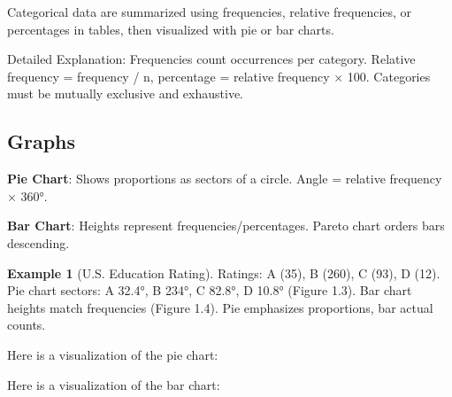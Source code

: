 \documentclass{article}
\theoremstyle{definition}
\newtheorem{example}{Example}
\begin{document}
	Categorical data are summarized using frequencies, relative frequencies, or percentages in tables, then visualized with pie or bar charts.
	
	Detailed Explanation: Frequencies count occurrences per category. Relative frequency = frequency / n, percentage = relative frequency × 100. Categories must be mutually exclusive and exhaustive.
	
	\subsection{Graphs}
	
	\textbf{Pie Chart}: Shows proportions as sectors of a circle. Angle = relative frequency × 360°.
	
	\textbf{Bar Chart}: Heights represent frequencies/percentages. Pareto chart orders bars descending.
	
	\begin{example}[U.S. Education Rating]
		Ratings: A (35), B (260), C (93), D (12). Pie chart sectors: A 32.4°, B 234°, C 82.8°, D 10.8° (Figure 1.3). Bar chart heights match frequencies (Figure 1.4). Pie emphasizes proportions, bar actual counts.
		
		Here is a visualization of the pie chart:
		
		
		Here is a visualization of the bar chart:
		
	\end{example}
	
\end{document}
